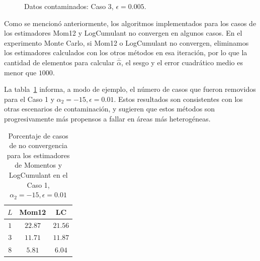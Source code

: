 \begin{figure}[h!]
	\caption{\label{Caso3}\small Datos contaminados: Caso 3, $\epsilon=0.005$.}
\end{figure}

Como se mencionó anteriormente, los algoritmos implementados para los casos de los estimadores Mom12 y LogCumulant no convergen en algunos casos. En el experimento Monte Carlo, si Mom12 o LogCumulant no convergen, eliminamos los estimadores calculados con los otros métodos en esa iteración, por lo que la cantidad de elementos para calcular $\overline{\widehat{\alpha}}$, el sesgo y el error cuadrático medio es menor que $1000$.

La tabla~\ref{tabla_removidos} informa, a modo de ejemplo, el número de casos que fueron removidos para el Caso 1 y $\alpha_2 = -15, \epsilon = 0.01$. Estos resultados son consistentes con los otras escenarios de contaminación, y sugieren que estos métodos son progresivamente más propensos a fallar en áreas más heterogéneas.

\begin{table}[htb]
	\centering
	\begin{tabular}{ccc}
		\toprule
		$L$ & Mom12  & LC \\
		\midrule
		$1$ & $22.87$  & $21.56$ \\
		$3$ & $11.71$  &  $11.87$ \\
		$8$ & $5.81$ & $6.04$  \\
		\bottomrule
	\end{tabular}
\caption{\label{tabla_removidos}Porcentaje de casos de no convergencia para los estimadores de Momentos y LogCumulant en el Caso 1, $\alpha_2 = -15, \epsilon = 0.01$}
\end{table}


